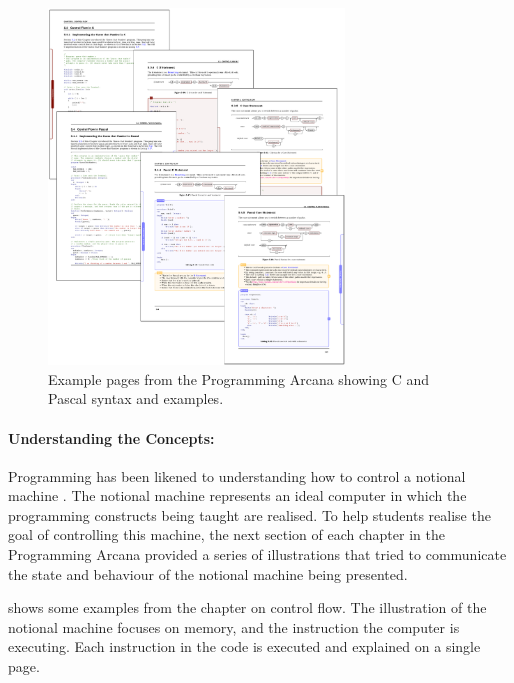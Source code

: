 \begin{figure}[h]
  \centering
  \includegraphics[width=0.7\textwidth]{ArcanaSyntax}
  \caption{Example pages from the Programming Arcana showing C and Pascal syntax and examples.}
  \label{fig:arcana_syntax}
\end{figure}


\clearpage

\paragraph{Understanding the Concepts:} %
\label{par:understanding_the_concepts_}


Programming has been likened to understanding how to control a notional machine \cite{DuBoulay:1986}. The notional machine represents an ideal computer in which the programming constructs being taught are realised. To help students realise the goal of controlling this machine, the next section of each chapter in the Programming Arcana provided a series of illustrations that tried to communicate the state and behaviour of the notional machine being presented. 

 shows some examples from the chapter on control flow. The illustration of the notional machine focuses on memory, and the instruction the computer is executing. Each instruction in the code is executed and explained on a single page.

